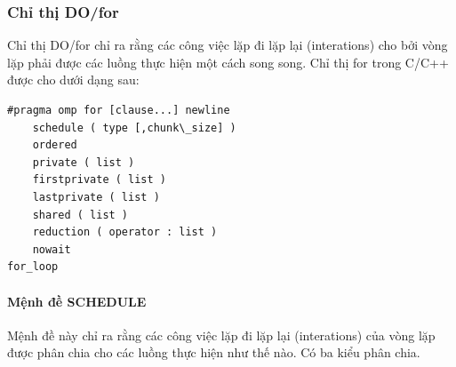 \documentclass{report}
\begin{document}
\subsubsection{Chỉ thị DO/for}
Chỉ thị \textsf{DO/for} chỉ ra rằng các công việc lặp đi lặp lại (interations) cho bởi
vòng lặp phải được các luồng thực hiện một cách song song. Chỉ thị for trong C/C++
được cho dưới dạng sau:
\begin{verbatim}
#pragma omp for [clause...] newline
	schedule ( type [,chunk\_size] )
	ordered
	private ( list )
	firstprivate ( list )
	lastprivate ( list )
	shared ( list )
	reduction ( operator : list )
	nowait
for_loop
\end{verbatim}

\paragraph{Mệnh đề SCHEDULE}
Mệnh đề này chỉ ra rằng các công việc lặp đi lặp lại (interations) của vòng lặp
được phân chia cho các luồng thực hiện như thế nào. Có ba kiểu phân chia.
\end{document}
